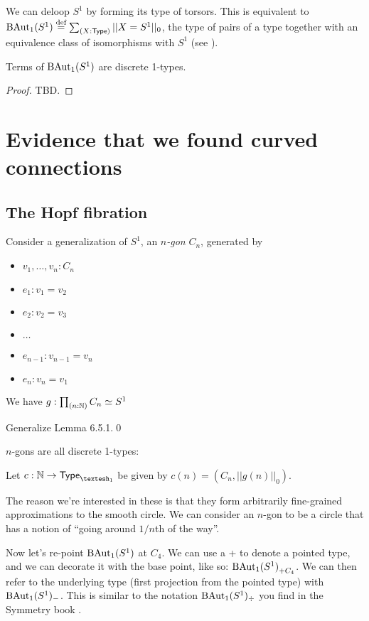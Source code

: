 \documentclass[12pt]{article}
\begin{document}
We can deloop \(S^1\) by forming its type of torsors. This is equivalent to \(\mathrm{BAut}_1(S^1)\stackrel{\textup{def}}{=}\sum_{(X:\mathsf{Type})}||X=S^1||_0\), the type of pairs of a type together with an equivalence class of isomorphisms with \( S^1 \) (see \cite{buchholtz2023central}). 

\begin{mylemma}Terms of \( \mathrm{BAut}_1(S^1) \) are discrete 1-types.\end{mylemma}\begin{proof} TBD.\end{proof}

\section{Evidence that we found curved connections}

\subsection{The Hopf fibration}

Consider a generalization of \( S^1 \),  an \emph{\( n \)-gon} \( C_n \), generated by
\begin{itemize}
\item \( v_1,\ldots,v_n:C_n \)
\item \( e_1:v_1=v_2\)
\item \( e_2:v_2=v_3 \)
\item \( \ldots \) 
\item \(e_{n-1}:v_{n-1}=v_n\)
\item \(e_n:v_n=v_1 \)
\end{itemize}

\begin{mylemma}
  We have \( g:\prod_{(n:\mathbb{N})}C_n\simeq S^1 \)
\end{mylemma}
\proof Generalize \cite{hottbook} Lemma 6.5.1.\qed

\( n \)-gons are all discrete 1-types:

\begin{mydef}
Let \( c:\nn\to \Typeo \) be given by \( c(n)=(C_n, ||g(n)||_0)\).
\end{mydef}

The reason we're interested in these is that they form arbitrarily fine-grained approximations to the smooth circle. We can consider an \( n \)-gon to be a circle that has a notion of ``going around \( 1/n \)th of the way''.

Now let's re-point \( \mathrm{BAut}_1(S^1) \) at \( C_4 \). We can use a + to denote a pointed type, and we can decorate it with the base point, like so: \( {\mathrm{BAut}_1(S^1)}_{+{C_4}} \). We can then refer to the underlying type (first projection from the pointed type) with \( \mathrm{BAut}_1(S^1)_- \). This is similar to the notation \( \mathrm{BAut}_1(S^1)_{\div} \) you find in the Symmetry book \cite{Symmetry}.
\end{document}
